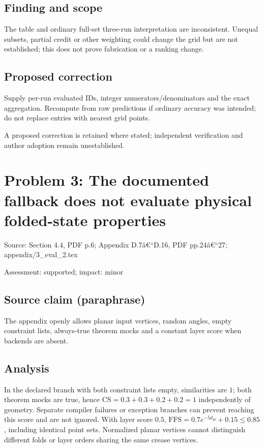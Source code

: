 \documentclass[11pt]{article}
\begin{document}
\subsection*{Finding and scope}

The table and ordinary full-set three-run interpretation are inconsistent. Unequal subsets, partial credit or other weighting could change the grid but are not established; this does not prove fabrication or a ranking change.

\subsection*{Proposed correction}

Supply per-run evaluated IDs, integer numerators/denominators and the exact aggregation. Recompute from raw predictions if ordinary accuracy was intended; do not replace entries with nearest grid points.

A proposed correction is retained where stated; independent verification and author adoption remain unestablished.

\section*{Problem 3: The documented fallback does not evaluate physical folded-state properties}

Source: Section 4.4, PDF p.6; Appendix D.7â€“D.16, PDF pp.24â€“27; appendix/3\_eval\_2.tex

Assessment: supported; impact: minor

\subsection*{Source claim (paraphrase)}

The appendix openly allows planar input vertices, random angles, empty constraint lists, always-true theorem mocks and a constant layer score when backends are absent.

\subsection*{Analysis}

In the declared branch with both constraint lists empty, similarities are \(1\); both theorem mocks are true, hence \(\mathrm{CS}=0.3+0.3+0.2+0.2=1\) independently of geometry. Separate compiler failures or exception branches can prevent reaching this score and are not ignored. With layer score \(0.5\), \(\mathrm{FFS}=0.7e^{-5d_H}+0.15\le0.85\), including identical point sets. Normalized planar vertices cannot distinguish different folds or layer orders sharing the same crease vertices.
\end{document}

